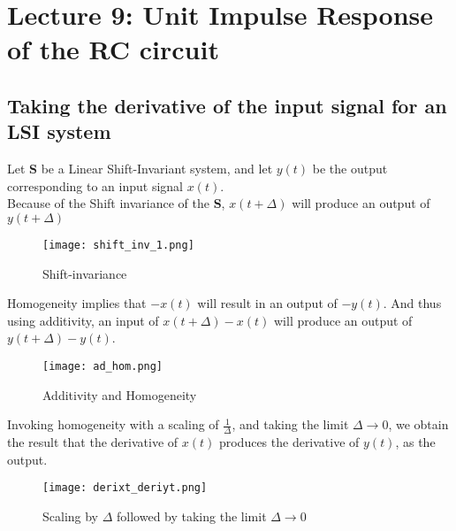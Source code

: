 \section{Lecture 9: Unit Impulse Response of the RC circuit}


\subsection{Taking the derivative of the input signal for an LSI system}
Let \textbf{S} be a Linear Shift-Invariant system, and let $y(t)$ be the output corresponding to an input signal $x(t)$.\\
\indent Because of the Shift invariance of the \textbf{S}, $x(t+\Delta)$ will produce an output of $y(t+\Delta)$
\begin{figure}[H]
	\centering
	\texttt{[image: shift\_inv\_1.png]}
	\caption{Shift-invariance}
\end{figure}
\indent Homogeneity implies that $-x(t)$ will result in an output of $-y(t)$. And thus using additivity, an input of $x(t+\Delta)-x(t)$ will produce an output of $y(t+\Delta)-y(t)$.
\begin{figure}[H]
	\centering
	\texttt{[image: ad\_hom.png]}
	\caption{Additivity and Homogeneity}
\end{figure}
\indent Invoking homogeneity with a scaling of $\frac{1}{\Delta}$, and taking the limit $\Delta\rightarrow0$, we obtain the result that the derivative of $x(t)$ produces the derivative of $y(t)$, as the output.
\begin{figure}[H]
	\centering
	\texttt{[image: derixt\_deriyt.png]}
	\caption{Scaling by $\Delta$ followed by taking the limit $\Delta\rightarrow 0$}
\end{figure}



